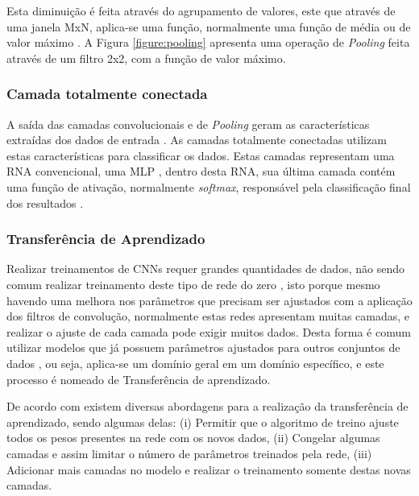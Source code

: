 \par Esta diminuição é feita através do agrupamento de valores, este que através de uma janela MxN, aplica-se uma função, normalmente uma função de média ou de valor máximo \cite{Amidi2018}. A Figura \ref{figure:pooling} apresenta uma operação de \textit{Pooling} feita através de um filtro 2x2, com a função de valor máximo.


\subsubsection{Camada totalmente conectada}

\par A saída das camadas convolucionais e de \textit{Pooling} geram as características extraídas dos dados de entrada \cite{Carneiro2017}. As camadas totalmente conectadas utilizam estas características para classificar os dados. Estas camadas representam uma RNA convencional, uma MLP \cite{Haykin2001}, dentro desta RNA, sua última camada contém uma função de ativação, normalmente \textit{softmax}, responsável pela classificação final dos resultados \cite{Bishop2006}. 

\subsubsection{Transferência de Aprendizado}

\par Realizar treinamentos de CNNs requer grandes quantidades de dados, não sendo comum realizar treinamento deste tipo de rede do zero \cite{Carneiro2017}, isto porque mesmo havendo uma melhora nos parâmetros que precisam ser ajustados com a aplicação dos filtros de convolução, normalmente estas redes apresentam muitas camadas, e realizar o ajuste de cada camada pode exigir muitos dados. Desta forma é comum utilizar modelos que já possuem parâmetros ajustados para outros conjuntos de dados \cite{Ponti2018}, ou seja, aplica-se um domínio geral em um domínio específico, e este processo é nomeado de Transferência de aprendizado.

\par De acordo com  existem diversas abordagens para a realização da transferência de aprendizado, sendo algumas delas: (i) Permitir que o algoritmo de treino ajuste todos os pesos presentes na rede com os novos dados, (ii) Congelar algumas camadas e assim limitar o número de parâmetros treinados pela rede, (iii) Adicionar mais camadas no modelo e realizar o treinamento somente destas novas camadas.

